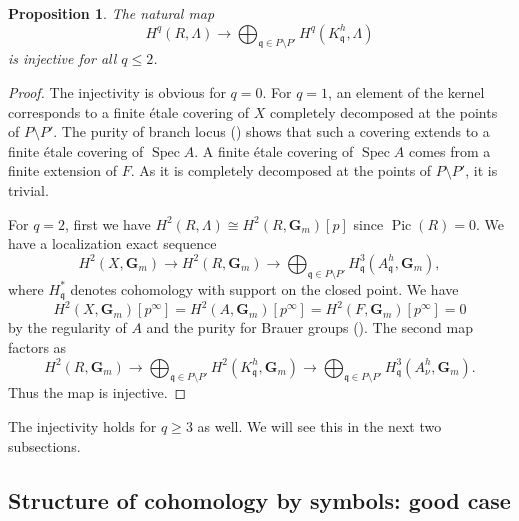 \documentclass{amsart}
\newtheorem{Prop}[Thm]{Proposition}
\theoremstyle{remark}
\numberwithin{equation}{subsection}
\newcommand{\Gm}{\mathbf{G}_{m}}
\newcommand{\ideal}[1]{\mathfrak{#1}}
\DeclareMathOperator{\Spec}{Spec}
\DeclareMathOperator{\Pic}{Pic}
\begin{document}
\begin{Prop} \label{0067}
	The natural map
		\[
				H^{q}(R, \Lambda)
			\to
				\bigoplus_{\ideal{q} \in P \setminus P'}
					H^{q}(K_{\ideal{q}}^{h}, \Lambda)
		\]
	is injective for all $q \le 2$.
\end{Prop}

\begin{proof}
	The injectivity is obvious for $q = 0$.
	For $q = 1$, an element of the kernel corresponds to a finite \'etale covering of $X$
	completely decomposed at the points of $P \setminus P'$.
	The purity of branch locus (\cite[Tag 0BMA]{Sta21}) shows that
	such a covering extends to a finite \'etale covering of $\Spec A$.
	A finite \'etale covering of $\Spec A$ comes from a finite extension of $F$.
	As it is completely decomposed at the points of $P \setminus P'$,
	it is trivial.
	
	For $q = 2$, first we have $H^{2}(R, \Lambda) \cong H^{2}(R, \Gm)[p]$
	since $\Pic(R) = 0$.
	We have a localization exact sequence
		\[
				H^{2}(X, \Gm)
			\to
				H^{2}(R, \Gm)
			\to
				\bigoplus_{\ideal{q} \in P \setminus P'}
					H^{3}_{\ideal{q}}(A_{\ideal{q}}^{h}, \Gm),
		\]
	where $H^{\ast}_{\ideal{q}}$ denotes cohomology with support on the closed point.
	We have
		\[
				H^{2}(X, \Gm)[p^{\infty}]
			=
				H^{2}(A, \Gm)[p^{\infty}]
			=
				H^{2}(F, \Gm)[p^{\infty}]
			=
				0
		\]
	by the regularity of $A$ and the purity for Brauer groups
	(\cite[Theorem (6.1), Corollary (6.2)]{Gro68}).
	The second map factors as
		\[
				H^{2}(R, \Gm)
			\to
				\bigoplus_{\ideal{q} \in P \setminus P'}
					H^{2}(K_{\ideal{q}}^{h}, \Gm)
			\to
				\bigoplus_{\ideal{q} \in P \setminus P'}
					H^{3}_{\ideal{q}}(A_{\nu}^{h}, \Gm).
		\]
	Thus the map is injective.
\end{proof}

The injectivity holds for $q \ge 3$ as well.
We will see this in the next two subsections.


\subsection{Structure of cohomology by symbols: good case}
\label{0068}
\end{document}
